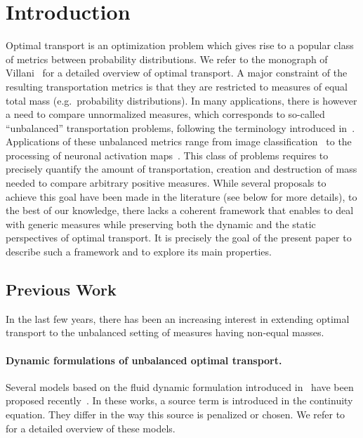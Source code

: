 
\section{Introduction}

Optimal transport is an optimization problem which gives rise to a popular class of metrics between probability distributions. We refer to the monograph of Villani~\cite{cedric2003topics} for a detailed overview of optimal transport. 
%
A major constraint of the resulting transportation metrics is that they are restricted to measures of equal total mass (e.g.\ probability distributions). In many applications, there is however a need to compare unnormalized measures, which corresponds to so-called ``unbalanced'' transportation problems, following the terminology introduced in~\cite{benamou2003numerical}. Applications of these unbalanced metrics range from image classification~\cite{rubner1997earth,pele2008linear} to the processing of neuronal activation maps~\cite{GramfortMICCAI}.
%
This class of problems requires to precisely quantify the amount of transportation, creation and destruction of mass needed to compare arbitrary positive measures. While several proposals to achieve this goal have been made in the literature (see below for more details), to the best of our knowledge, there lacks a coherent framework that enables to deal with generic measures while preserving both the dynamic and the static perspectives of optimal transport. It is precisely the goal of the present paper to describe such a framework and to explore its main properties. 

\subsection{Previous Work}
In the last few years, there has been an increasing interest in extending optimal transport to the unbalanced setting of measures having non-equal masses. 
\paragraph{Dynamic formulations of unbalanced optimal transport. }

Several models based on the fluid dynamic formulation introduced in~\cite{benamou2000computational} have been proposed recently~\cite{OTmaasrumpf,lombardi2013eulerian,piccoli2014generalized,piccoli2013properties}. In these works, a source term is introduced in the continuity equation. They differ in the way this source is penalized or chosen.
%
We refer to~\cite{ChizatOTFR2015} for a detailed overview of these models.  

